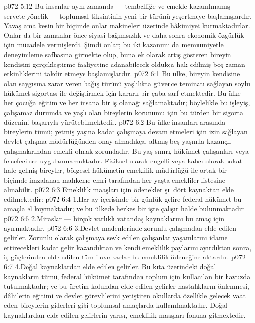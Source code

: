 \vs p072 5:12 Bu insanlar aynı zamanda --- tembelliğe ve emekle kazanılmamış servete yönelik --- toplumsal tiksintinin yeni bir türünü yeşertmeye başlamışlardır. Yavaş ama kesin bir biçimde onlar makineleri üzerinde hâkimiyet kurmaktadırlar. Onlar da bir zamanlar önce siyasi bağımsızlık ve daha sonra ekonomik özgürlük için mücadele vermişlerdi. Şimdi onlar; bu iki kazanımı da memnuniyetle deneyimleme safhasına girmekte olup, buna ek olarak artış gösteren bireyin kendisini gerçekleştirme faaliyetine adanabilecek oldukça hak edilmiş boş zaman etkinliklerini takdir etmeye başlamışlardır.
\vs p072 6:1 Bu ülke, bireyin kendisine olan saygısına zarar veren bağış türünü yaşlılıkta güvence teminatı sağlayan soylu hükümet sigortası ile değiştirmek için kararlı bir çaba sarf etmektedir. Bu ülke her çocuğa eğitim ve her insana bir iş olanağı sağlamaktadır; böylelikle bu işleyiş, çalışamaz durumda ve yaşlı olan bireylerin korunumu için bu türden bir sigorta düzenini başarıyla yürütebilmektedir.
\vs p072 6:2 Bu ülke insanları arasında bireylerin tümü; yetmiş yaşına kadar çalışmaya devam etmeleri için izin sağlayan devlet çalışma müdürlüğünden onay almadıkça, altmış beş yaşında kazançlı çalışmalarından emekli olmak zorundadır. Bu yaş sınırı, hükümet çalışanları veya felsefecilere uygulanmamaktadır. Fiziksel olarak engelli veya kalıcı olarak sakat hale gelmiş bireyler, bölgesel hükümetin emeklilik müdürlüğü ile ortak bir biçimde imzalanan mahkeme emri tarafından her yaşta emekliler listesine alınabilir.
\vs p072 6:3 Emeklilik maaşları için ödenekler şu dört kaynaktan elde edilmektedir:
\vs p072 6:4 1.\bibnobreakspace Her ay içerisinde bir günlük gelire federal hükümet bu amaçla el koymaktadır; ve bu ülkede herkes bir işte çalışır halde bulunmaktadır
\vs p072 6:5 2.\bibnobreakspace Miraslar --- birçok varlıklı vatandaş kaynaklarını bu amaç için ayırmaktadır.
\vs p072 6:6 3.\bibnobreakspace Devlet madenlerinde zorunlu çalışmadan elde edilen gelirler. Zorunlu olarak çalışmaya sevk edilen çalışanlar yaşamlarını idame ettirecekleri kadar gelir kazandıktan ve kendi emeklilik paylarını ayırdıktan sonra, iş güçlerinden elde edilen tüm ilave karlar bu emeklilik ödeneğine aktarılır.
\vs p072 6:7 4.\bibnobreakspace Doğal kaynaklardan elde edilen gelirler. Bu kıta üzerindeki doğal kaynakların tümü, federal hükümet tarafından toplum için kullanılan bir havuzda tutulmaktadır; ve bu üretim kolundan elde edilen gelirler hastalıkların önlenmesi, dâhilerin eğitimi ve devlet görevlilerini yetiştiren okullarda özellikle gelecek vaat eden bireylerin giderleri gibi toplumsal amaçlarda kullanılmaktadır. Doğal kaynaklardan elde edilen gelirlerin yarısı, emeklilik maaşları fonuna gitmektedir.
